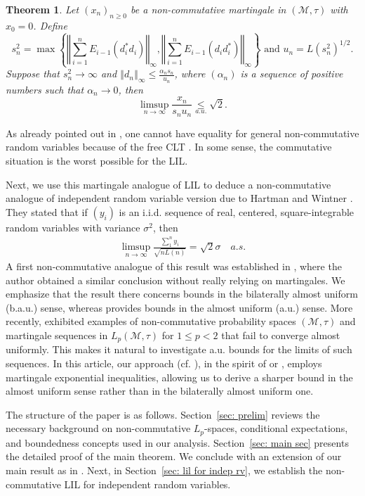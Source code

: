 \documentclass[10pt]{amsart}
\newtheorem{thm}{Theorem}[section]
\theoremstyle{definition}
\theoremstyle{myremark}
\numberwithin{equation}{section}
\newcommand{\CM}{\mathcal{M}}
\newcommand{\norm}[1]{\left\Vert#1\right\Vert}
\begin{document}
\begin{thm}
    Let $(x_n)_{n \geq 0}$ be a non-commutative martingale in $(\mathcal{M}, \tau)$ with $x_0 = 0$. Define 
    $$
    s_n^2=\max\left\{\norm{\sum_{i=1}^n E_{i-1}(d_i^*d_i)}_\infty,\norm{\sum_{i=1}^n E_{i-1}(d_id_i^*)}_\infty\right\} \text{ and } u_n=L(s_n^2)^{1/2}.
    $$
    Suppose that $s_n^2 \to \infty$ and $\norm{d_n}_\infty \leq \frac{\alpha_n s_n}{u_n}$, where $(\alpha_n)$ is a sequence of positive numbers such that $\alpha_n \to 0$, then 
    $$
    \limsup_{n \to \infty} \frac{x_n}{s_n u_n} \underset{a.u.}{\leq }\sqrt{2}.
    $$
  \end{thm}

As already pointed out in \cite{zeng2015kolmogorov}, one cannot have equality for general non-commutative random variables because of the free CLT \cite{Voi}. In some sense, the commutative situation is the worst possible for the LIL.


Next, we use this martingale analogue of LIL to deduce a non-commutative analogue of independent random variable version due to Hartman and Wintner \cite{hartman1941law}. They stated that if $(y_i)$ is an i.i.d. sequence of real, centered, square-integrable random variables with variance $\sigma^2$, then 
\begin{align*}
    \limsup_{n \to \infty} \frac{\sum_1^n y_i}{\sqrt{n L(n)}}= \sqrt 2 \sigma \quad a.s.
\end{align*}
A first non-commutative analogue of this result was  established in \cite[Theorem 3.23]{konwerska2008law}, where the author obtained a similar conclusion without really relying on martingales.  We emphasize that the result there concerns bounds in the bilaterally almost uniform (b.a.u.) sense, whereas \cite[Theorem 1]{zeng2015kolmogorov} provides bounds in the almost uniform (a.u.) sense. More recently, \cite{hong2024failure} exhibited examples of non-commutative probability spaces $(\CM, \tau)$ and martingale sequences in $L_p(\CM, \tau)$ for $1 \leq p <2$ that fail to converge almost uniformly. This makes it natural to investigate a.u. bounds for the limits of such sequences. In this article, our approach (cf. ), in the spirit of \cite{hartman1941law} or \cite{deAcosta},   employs martingale exponential inequalities, allowing us to derive a sharper bound in the almost uniform sense rather than in the bilaterally almost uniform one.


The structure of the paper is as follows. Section~\ref{sec: prelim} reviews the necessary background on non-commutative $L_p$-spaces, conditional expectations, and boundedness concepts used in our analysis. Section~\ref{sec: main sec} presents the detailed proof of the main theorem. We conclude with an extension of our main result as in \cite{stout1970martingale}. Next, in Section~\ref{sec: lil for indep rv}, we establish the non-commutative LIL for independent random variables.
\end{document}
